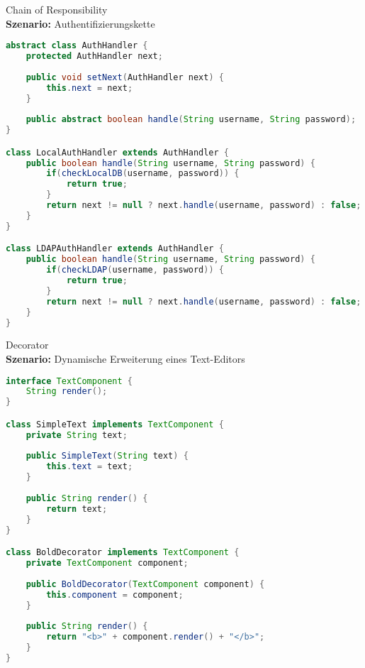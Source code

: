 \begin{example2}{Chain of Responsibility}\\
\textbf{Szenario:} Authentifizierungskette
\begin{lstlisting}[language=Java, style=base]
abstract class AuthHandler {
    protected AuthHandler next;
    
    public void setNext(AuthHandler next) {
        this.next = next;
    }
    
    public abstract boolean handle(String username, String password);
}

class LocalAuthHandler extends AuthHandler {
    public boolean handle(String username, String password) {
        if(checkLocalDB(username, password)) {
            return true;
        }
        return next != null ? next.handle(username, password) : false;
    }
}

class LDAPAuthHandler extends AuthHandler {
    public boolean handle(String username, String password) {
        if(checkLDAP(username, password)) {
            return true;
        }
        return next != null ? next.handle(username, password) : false;
    }
}
\end{lstlisting}
\end{example2}

\begin{example2}{Decorator}\\
\textbf{Szenario:} Dynamische Erweiterung eines Text-Editors
\begin{lstlisting}[language=Java, style=base]
interface TextComponent {
    String render();
}

class SimpleText implements TextComponent {
    private String text;
    
    public SimpleText(String text) {
        this.text = text;
    }
    
    public String render() {
        return text;
    }
}

class BoldDecorator implements TextComponent {
    private TextComponent component;
    
    public BoldDecorator(TextComponent component) {
        this.component = component;
    }
    
    public String render() {
        return "<b>" + component.render() + "</b>";
    }
}
\end{lstlisting}
\end{example2}

